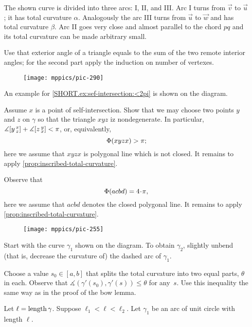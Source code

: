 The shown curve is divided into three arcs: I, II, and III. 
Arc I turns from $\vec v$ to $\vec u$;
it has total curvature $\alpha$.
Analogously the arc III turns from $\vec u$ to $\vec w$  and has total curvature $\beta$. 
Arc II goes very close and almost parallel to the chord $pq$ and its total curvature can be made arbitrary small.


Use that exterior angle of a triangle equals to the sum of the two remote interior angles;
for the second part apply the induction on number of vertexes.

\begin{wrapfigure}{r}{23 mm}
\vskip-0mm
\centering
\texttt{[image: mppics/pic-290]}
\vskip-4mm
\end{wrapfigure}

 An example for \ref{SHORT.ex:sef-intersection:<2pi} is shown on the diagram. 

 Assume $x$ is a point of self-intersection.
Show that we may choose two points $y$ and $z$ on $\gamma$ so that the triangle $xyz$ iz nondegenerate.
In particular, 
$\measuredangle[y\,{}^{x}_{z}]
+
\measuredangle[z\,{}^{y}_{x}]
<\pi$, or, equivalently, 
\[\Phi({xyzx})>\pi;\]
here we assume that $xyzx$ is polygonal line which is not closed. 
It remains to apply \ref{prop:inscribed-total-curvature}.

Observe that 
\[\tc{acbd}=4\cdot\pi,\]
here we assume that $acbd$ denotes the closed polygonal line.
It remains to apply \ref{prop:inscribed-total-curvature}.

{

\begin{wrapfigure}{r}{22 mm}
\vskip-6mm
\centering
\texttt{[image: mppics/pic-255]}
\vskip0mm
\end{wrapfigure}

Start with the curve $\gamma_1$ shown on the diagram.
To obtain $\gamma_2$, slightly unbend (that is, decrease the curvature of) the dashed arc of $\gamma_1$.

}

Choose a value $s_0\in[a,b]$ that splits the total curvature into two equal parts, $\theta$ in each.
Observe that $\measuredangle(\gamma'(s_0),\gamma'(s))\le \theta$ for any~$s$.
Use this inequality the same way as in the proof of the bow lemma.

Let $\ell=\mathop{\rm length}\nolimits\gamma$.
Suppose $\ell_1<\ell<\ell_2$.
Let $\gamma_1$ be an arc of unit circle with length $\ell$.


